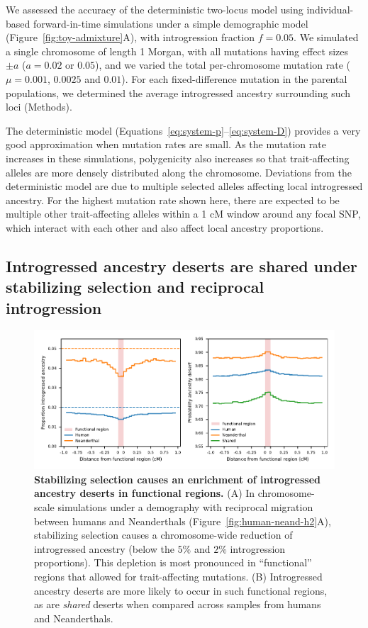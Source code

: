 \documentclass{article}
\begin{document}
We assessed the accuracy of the deterministic two-locus model using
individual-based forward-in-time simulations \citep{thornton2019polygenic}
under a simple demographic model (Figure~\ref{fig:toy-admixture}A), with
introgression fraction \(f=0.05\). We simulated a single chromosome of length 1
Morgan, with all mutations having effect sizes \(\pm a\) (\(a=0.02\) or
\(0.05\)), and we varied the total per-chromosome mutation rate (\(\mu=0.001\),
\(0.0025\) and \(0.01\)). For each fixed-difference mutation in the parental
populations, we determined the average introgressed ancestry surrounding such
loci (Methods).

The deterministic model (Equations~\ref{eq:system-p}--\ref{eq:system-D})
provides a very good approximation when mutation rates are small. As the
mutation rate increases in these simulations, polygenicity also increases so
that trait-affecting alleles are more densely distributed along the chromosome.
Deviations from the deterministic model are due to multiple selected alleles
affecting local introgressed ancestry. For the highest mutation rate shown
here, there are expected to be multiple other trait-affecting alleles within a
1 cM window around any focal SNP, which interact with each other and also
affect local ancestry proportions.

\subsection*{Introgressed ancestry deserts are shared under stabilizing
selection and reciprocal introgression}

\begin{figure}[t!]
    \centering
    \includegraphics{../figures/introgression_deserts.SD_0.02.pdf}
    \caption{
        \textbf{Stabilizing selection causes an enrichment of introgressed
        ancestry deserts in functional regions.} (A) In chromosome-scale
        simulations under a demography with reciprocal migration between humans
        and Neanderthals (Figure~\ref{fig:human-neand-h2}A), stabilizing
        selection causes a chromosome-wide reduction of introgressed ancestry
        (below the $5\%$ and $2\%$ introgression proportions). This depletion
        is most pronounced in ``functional'' regions that allowed for
        trait-affecting mutations. (B) Introgressed ancestry deserts are
        more likely to occur in such functional regions, as are
        \emph{shared} deserts when compared across samples from humans and
        Neanderthals.
    }
    \label{fig:deserts}
\end{figure}
\end{document}

